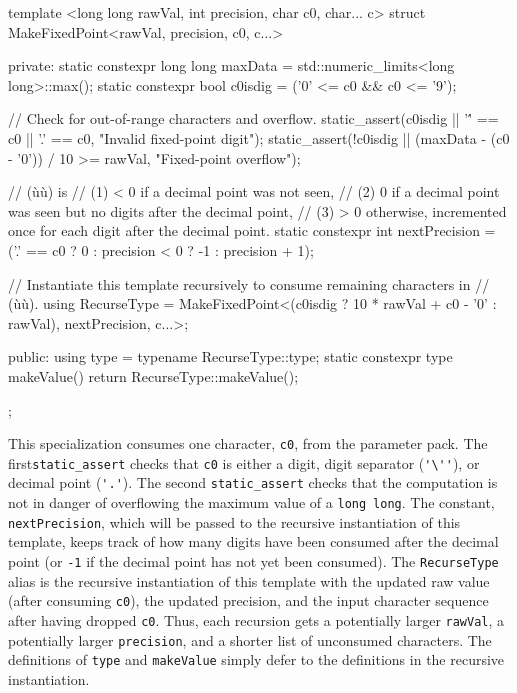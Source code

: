 \begin{emcppslisting}[emcppsbatch=e17]
template <long long rawVal, int precision, char c0, char... c>
struct MakeFixedPoint<rawVal, precision, c0, c...>
{
private:
    static constexpr long long maxData = std::numeric_limits<long long>::max();
    static constexpr bool      c0isdig = ('0' <= c0 && c0 <= '9');

    // Check for out-of-range characters and overflow.
    static_assert(c0isdig || '\'' == c0 || '.' == c0,
                  "Invalid fixed-point digit");
    static_assert(!c0isdig || (maxData - (c0 - '0')) / 10 >= rawVal,
                  "Fixed-point overflow");

    // (ù{}ù) is
    // (1) < 0 if a decimal point was not seen,
    // (2) 0   if a decimal point was seen but no digits after the decimal point,
    // (3) > 0 otherwise, incremented once for each digit after the decimal point.
    static constexpr int nextPrecision = ('.' == c0     ?  0 :
                                          precision < 0 ? -1 :
                                          precision + 1);

    // Instantiate this template recursively to consume remaining characters in
    // (ù{}ù).
    using RecurseType = MakeFixedPoint<(c0isdig ? 10 * rawVal + c0 - '0' :
                                        rawVal), nextPrecision, c...>;

public:
    using                 type = typename RecurseType::type;
    static constexpr type makeValue() { return RecurseType::makeValue(); }
};
\end{emcppslisting}
    
\noindent This specialization consumes one character, \lstinline!c0!, from the
parameter pack. The first\linebreak[4]%
\lstinline!static_assert! checks that
\lstinline!c0! is either a digit, digit separator
(\lstinline!'\''!), 
or decimal point (\lstinline!'.'!). The second
\lstinline!static_assert! checks that the computation is not in danger of
overflowing the maximum value of a \lstinline!long!~\lstinline!long!. The
constant, \lstinline!nextPrecision!, which will be passed to the recursive
instantiation of this template, keeps track of how many digits have been
consumed after the decimal point (or \lstinline!-1! if the decimal point has not yet
been consumed). The \lstinline!RecurseType! alias is the recursive
instantiation of this template with the updated raw value (after
consuming \lstinline!c0!), the updated precision, and the input character
sequence after having dropped \lstinline!c0!. Thus, each recursion gets a
potentially larger \lstinline!rawVal!, a potentially larger
\lstinline!precision!, and a shorter list of unconsumed characters. The
definitions of \lstinline!type! and \lstinline!makeValue! simply defer to the
definitions in the recursive instantiation.

